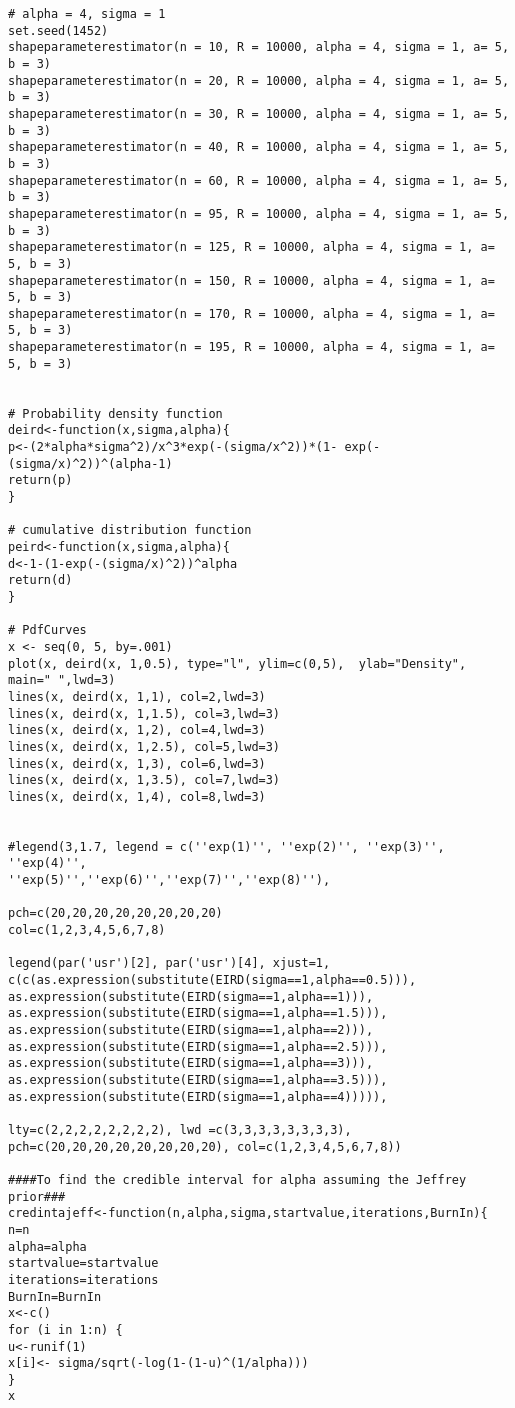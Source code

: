 \documentclass[a4paper,12pt]{report}
\begin{document}
{\begin{verbatim}
# alpha = 4, sigma = 1
set.seed(1452)
shapeparameterestimator(n = 10, R = 10000, alpha = 4, sigma = 1, a= 5, b = 3)
shapeparameterestimator(n = 20, R = 10000, alpha = 4, sigma = 1, a= 5, b = 3)
shapeparameterestimator(n = 30, R = 10000, alpha = 4, sigma = 1, a= 5, b = 3)
shapeparameterestimator(n = 40, R = 10000, alpha = 4, sigma = 1, a= 5, b = 3)
shapeparameterestimator(n = 60, R = 10000, alpha = 4, sigma = 1, a= 5, b = 3)
shapeparameterestimator(n = 95, R = 10000, alpha = 4, sigma = 1, a= 5, b = 3)
shapeparameterestimator(n = 125, R = 10000, alpha = 4, sigma = 1, a= 5, b = 3)
shapeparameterestimator(n = 150, R = 10000, alpha = 4, sigma = 1, a= 5, b = 3)
shapeparameterestimator(n = 170, R = 10000, alpha = 4, sigma = 1, a= 5, b = 3)
shapeparameterestimator(n = 195, R = 10000, alpha = 4, sigma = 1, a= 5, b = 3)


# Probability density function
deird<-function(x,sigma,alpha){
p<-(2*alpha*sigma^2)/x^3*exp(-(sigma/x^2))*(1- exp(-(sigma/x)^2))^(alpha-1)
return(p)
}

# cumulative distribution function
peird<-function(x,sigma,alpha){
d<-1-(1-exp(-(sigma/x)^2))^alpha
return(d)
}

# PdfCurves
x <- seq(0, 5, by=.001)
plot(x, deird(x, 1,0.5), type="l", ylim=c(0,5),  ylab="Density",
main=" ",lwd=3)
lines(x, deird(x, 1,1), col=2,lwd=3)
lines(x, deird(x, 1,1.5), col=3,lwd=3)
lines(x, deird(x, 1,2), col=4,lwd=3)
lines(x, deird(x, 1,2.5), col=5,lwd=3)
lines(x, deird(x, 1,3), col=6,lwd=3)
lines(x, deird(x, 1,3.5), col=7,lwd=3)
lines(x, deird(x, 1,4), col=8,lwd=3)


#legend(3,1.7, legend = c(''exp(1)'', ''exp(2)'', ''exp(3)'', ''exp(4)'',
''exp(5)'',''exp(6)'',''exp(7)'',''exp(8)''),

pch=c(20,20,20,20,20,20,20,20)
col=c(1,2,3,4,5,6,7,8) 

legend(par('usr')[2], par('usr')[4], xjust=1,
c(c(as.expression(substitute(EIRD(sigma==1,alpha==0.5))),
as.expression(substitute(EIRD(sigma==1,alpha==1))),
as.expression(substitute(EIRD(sigma==1,alpha==1.5))),
as.expression(substitute(EIRD(sigma==1,alpha==2))),
as.expression(substitute(EIRD(sigma==1,alpha==2.5))),
as.expression(substitute(EIRD(sigma==1,alpha==3))),
as.expression(substitute(EIRD(sigma==1,alpha==3.5))),
as.expression(substitute(EIRD(sigma==1,alpha==4))))),

lty=c(2,2,2,2,2,2,2,2), lwd =c(3,3,3,3,3,3,3,3),
pch=c(20,20,20,20,20,20,20,20), col=c(1,2,3,4,5,6,7,8)) 

####To find the credible interval for alpha assuming the Jeffrey prior###
credintajeff<-function(n,alpha,sigma,startvalue,iterations,BurnIn){
n=n
alpha=alpha
startvalue=startvalue
iterations=iterations
BurnIn=BurnIn
x<-c()
for (i in 1:n) {
u<-runif(1)
x[i]<- sigma/sqrt(-log(1-(1-u)^(1/alpha)))
}
x


\end{verbatim}}
\end{document}
